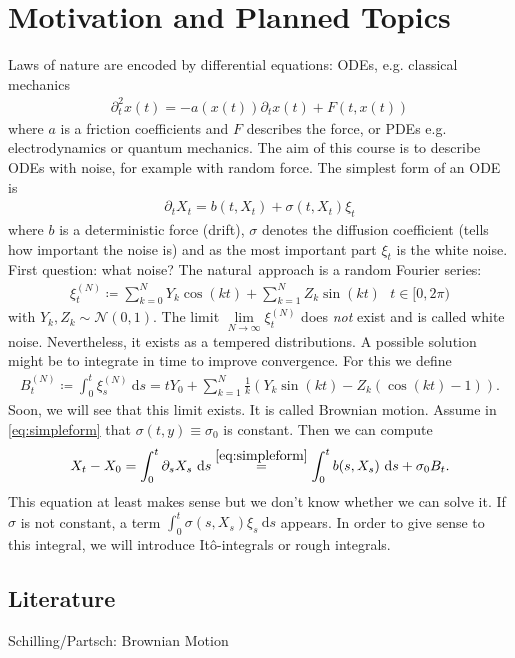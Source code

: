 \chapter*{Motivation and Planned Topics}
Laws of nature are encoded by differential equations: ODEs, e.g. classical mechanics 
\begin{align*}
\partial_t^2 x(t)=-a(x(t))\partial_t x(t)+F(t,x(t))
\end{align*}
where $a$ is a friction coefficients and $F$ describes the force,
or PDEs e.g. electrodynamics or quantum mechanics.
The aim of this course is to describe ODEs with noise, for example with random force.
The simplest form of an ODE is
\begin{align}\label{eq:simpleform}
\partial_t X_t=b(t,X_t)+\sigma(t,X_t)\xi_t
\end{align}
where $b$ is a deterministic force (drift), $\sigma$ denotes the diffusion coefficient (tells how important the noise is) and as the most important part
$\xi_t$ is the white noise.
First question: what noise?
The \glqq natural\grqq\, approach is a random Fourier series:
\begin{align}
\xi_t^{(N)}\coloneqq \sum_{k=0}^N Y_k \cos(kt)+ \sum_{k=1}^N Z_k \sin(kt)~~~t\in [0,2\pi)
\end{align}
with $Y_k,Z_k \sim \mathcal{N}(0,1)$.
The limit $\lim\limits_{N\to \infty} \xi_t^{(N)}$ does \emph{not} exist and is called \glqq white noise\grqq.
Nevertheless, it exists as a tempered distributions.
A possible solution might be to integrate in time to improve convergence. For this we define
\begin{align}
B_t^{(N)}\coloneqq \int_0^t\xi_s^{(N)}~\mathrm{d}s=tY_0+\sum_{k=1}^N \frac{1}{k}(Y_k\sin(kt)-Z_k(\cos(kt)-1)).
\end{align}
Soon, we will see that this limit exists. It is called \glqq Brownian motion\grqq.
Assume in \eqref{eq:simpleform} that $\sigma(t,y)\equiv \sigma_0$ is constant. Then we can compute
\begin{align*}
X_t-X_0=\int_0^t \partial_s X_s~\mathrm{d}s\overset{\eqref{eq:simpleform}}{=}\int_0^t b(s,X_s)~\mathrm{d}s+\sigma_0 B_t.
\end{align*}
This equation at least makes sense but we don't know whether we can solve it.
If $\sigma$ is not constant, a term $\int_0^t\sigma(s,X_s)\xi_s~\mathrm{d}s$ appears.
In order to give sense to this integral, we will introduce It\^o-integrals or rough integrals.

\section*{Literature}
Schilling/Partsch: \glqq Brownian Motion\grqq